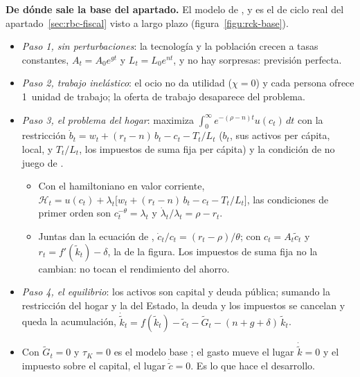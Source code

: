 \documentclass[11pt]{article}
\begin{document}
\begin{anotaciones}
\textbf{De dónde sale la base del apartado.} El modelo de ,  y  es el de ciclo real del apartado~\ref{sec:rbc-fiscal} visto a largo plazo (figura~\ref{figu:rck-base}).
\begin{itemize}
\item \emph{Paso 1, sin perturbaciones}: la tecnología y la población crecen a tasas constantes, $A_t=A_0e^{gt}$ y $L_t=L_0e^{nt}$, y no hay sorpresas: previsión perfecta.
\item \emph{Paso 2, trabajo inelástico}: el ocio no da utilidad ($\chi=0$) y cada persona ofrece 1~unidad de trabajo; la oferta de trabajo desaparece del problema.
\item \emph{Paso 3, el problema del hogar}: maximiza $\int_0^{\infty}e^{-(\rho-n)t}u(c_t)\,dt$ con la restricción $\dot b_t=w_t+(r_t-n)\,b_t-c_t-T_t/L_t$ ($b_t$, sus activos per cápita, local, y $T_t/L_t$, los impuestos de suma fija per cápita) y la condición de no juego de .
  \begin{itemize}
  \item Con el hamiltoniano en valor corriente, $\mathcal H_t=u(c_t)+\lambda_t\big[w_t+(r_t-n)\,b_t-c_t-T_t/L_t\big]$, las condiciones de primer orden son $c_t^{-\theta}=\lambda_t$ y $\dot\lambda_t/\lambda_t=\rho-r_t$.
  \item Juntas dan la ecuación de , $\dot c_t/c_t=(r_t-\rho)/\theta$; con $c_t=A_t\tilde c_t$ y $r_t=f'(\tilde k_t)-\delta$, la de la figura. Los impuestos de suma fija no la cambian: no tocan el rendimiento del ahorro.
  \end{itemize}
\item \emph{Paso 4, el equilibrio}: los activos son capital y deuda pública; sumando la restricción del hogar y la del Estado, la deuda y los impuestos se cancelan y queda la acumulación, $\dot{\tilde k}_t=f(\tilde k_t)-\tilde c_t-\tilde G_t-(n+g+\delta)\,\tilde k_t$.
\item Con $\tilde G_t=0$ y $\tau_K=0$ es el modelo base ; el gasto mueve el lugar $\dot{\tilde k}=0$ y el impuesto sobre el capital, el lugar $\dot{\tilde c}=0$. Es lo que hace el desarrollo.
\end{itemize}
\begin{infografiacaja}
\caption{Del modelo de ciclo real con Estado al de ,  y  con política fiscal}\label{figu:rck-base}
\end{infografiacaja}
\end{anotaciones}
\end{document}
